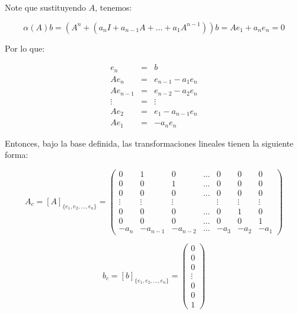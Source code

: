         Note que sustituyendo $A$, tenemos:

        \begin{equation}
            \alpha(A) b = (A^n + (a_nI + a_{n-1}A + \dots + a_1 A^{n-1})) b = A e_1 + a_n e_n = 0
        \end{equation}

        Por lo que:

        \begin{eqnarray}
        e_n & = & b \nonumber \\
        A e_{n} & = & e_{n-1} - a_1 e_n \nonumber \\
        A e_{n-1} & = & e_{n-2} - a_2 e_n \nonumber \\
        \vdots & = & \vdots \nonumber \\
        A e_2 & = & e_1 - a_{n-1} e_n \nonumber \\
        A e_1 & = & - a_{n} e_n
        \end{eqnarray}

        Entonces, bajo la base definida, las transformaciones lineales tienen la siguiente forma:

        \begin{equation}
            A_c = \left[ A \right]_{\{ e_1, e_2, \dots, e_n \}} =
            \begin{pmatrix}
            0 & 1 & 0 & \dots & 0 & 0 & 0 \\
            0 & 0 & 1 & \dots & 0 & 0 & 0 \\
            0 & 0 & 0 & \dots & 0 & 0 & 0 \\
            \vdots & \vdots & \vdots & & \vdots & \vdots & \vdots \\
            0 & 0 & 0 & \dots & 0 & 1 & 0 \\
            0 & 0 & 0 & \dots & 0 & 0 & 1 \\
            -a_{n} & -a_{n-1} & -a_{n-2} & \dots & -a_{3} & -a_{2} & -a_{1}
            \end{pmatrix}
        \end{equation}

        \begin{equation}
            b_c = \left[ b \right]_{\{ e_1, e_2, \dots, e_n \}} =
            \begin{pmatrix}
            0 \\
            0 \\
            0 \\
            \vdots \\
            0 \\
            0 \\
            1
            \end{pmatrix}
        \end{equation}

